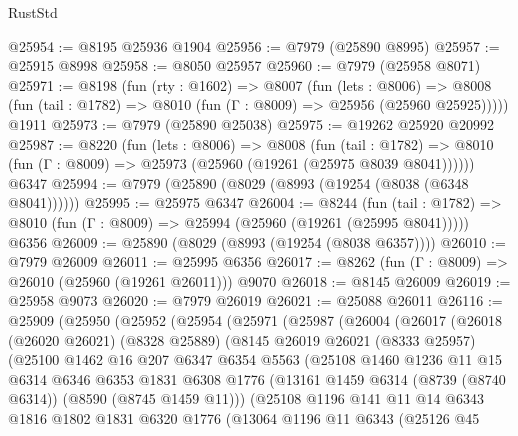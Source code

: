 \begin{lexlean}{RustStd}
\begin{coremodule}
@25954 := @8195 @25936 @1904
@25956 := @7979 (@25890 @8995)
@25957 := @25915 @8998
@25958 := @8050 @25957
@25960 := @7979 (@25958 @8071)
@25971 := @8198
    (fun (rty : @1602) =>
    @8007
      (fun (lets : @8006) =>
      @8008 (fun (tail : @1782) => @8010 (fun (Γ : @8009) => @25956 (@25960 @25925)))))
    @1911
@25973 := @7979 (@25890 @25038)
@25975 := @19262 @25920 @20992
@25987 := @8220
    (fun (lets : @8006) =>
    @8008
      (fun (tail : @1782) =>
      @8010 (fun (Γ : @8009) => @25973 (@25960 (@19261 (@25975 @8039 @8041))))))
    @6347
@25994 := @7979 (@25890 (@8029 (@8993 (@19254 (@8038 (@6348 @8041))))))
@25995 := @25975 @6347
@26004 := @8244
    (fun (tail : @1782) => @8010 (fun (Γ : @8009) => @25994 (@25960 (@19261 (@25995 @8041)))))
    @6356
@26009 := @25890 (@8029 (@8993 (@19254 (@8038 @6357))))
@26010 := @7979 @26009
@26011 := @25995 @6356
@26017 := @8262 (fun (Γ : @8009) => @26010 (@25960 (@19261 @26011))) @9070
@26018 := @8145 @26009
@26019 := @25958 @9073
@26020 := @7979 @26019
@26021 := @25088 @26011
@26116 := @25909
    (@25950
      (@25952
        (@25954
          (@25971
            (@25987
              (@26004
                (@26017
                  (@26018
                    (@26020 @26021)
                    (@8328 @25889)
                    (@8145
                      @26019
                      @26021
                      (@8333 @25957)
                      (@25100
                        @1462
                        @16
                        @207
                        @6347
                        @6354
                        @5563
                        (@25108
                          @1460
                          @1236
                          @11
                          @15
                          @6314
                          @6346
                          @6353
                          @1831
                          @6308
                          @1776
                          (@13161 @1459 @6314 (@8739 (@8740 @6314)) (@8590 (@8745 @1459 @11)))
                          (@25108
                            @1196
                            @141
                            @11
                            @14
                            @6343
                            @1816
                            @1802
                            @1831
                            @6320
                            @1776
                            (@13064
                              @1196
                              @11
                              @6343
                              (@25126
                                @45

\end{coremodule}
\end{lexlean}
